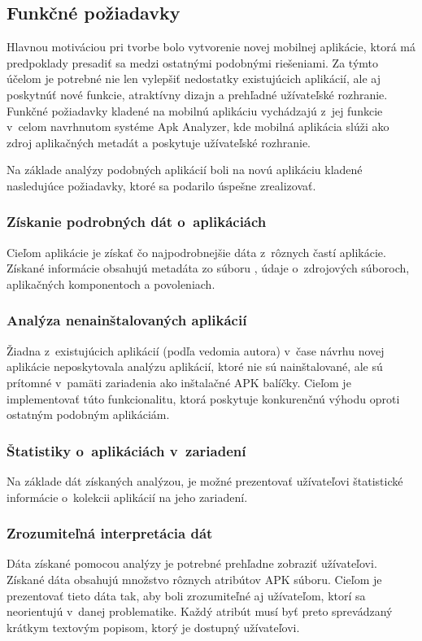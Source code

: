 \subsection{Funkčné požiadavky}
Hlavnou motiváciou pri tvorbe bolo vytvorenie novej mobilnej aplikácie, ktorá má predpoklady presadiť sa medzi ostatnými podobnými riešeniami.  Za týmto účelom je potrebné nie len vylepšiť nedostatky existujúcich aplikácií, ale aj poskytnúť nové funkcie, atraktívny dizajn a prehľadné užívateľské rozhranie.
Funkčné požiadavky kladené na mobilnú aplikáciu vychádzajú z~jej funkcie v~celom navrhnutom systéme Apk Analyzer, kde mobilná aplikácia slúži ako zdroj aplikačných metadát a poskytuje užívateľské rozhranie.


Na základe analýzy podobných aplikácií boli na novú aplikáciu kladené nasledujúce požiadavky, ktoré sa podarilo úspešne zrealizovať.

\subsubsection{\textbf{Získanie podrobných dát o~aplikáciách}}
Cieľom aplikácie je získať čo najpodrobnejšie dáta z~rôznych častí aplikácie. Získané informácie obsahujú metadáta zo súboru , údaje o~zdrojových súboroch, aplikačných komponentoch a povoleniach. 

\subsubsection{\textbf{Analýza nenainštalovaných aplikácií}}
Žiadna z~existujúcich aplikácií (podľa vedomia autora) v~čase návrhu novej aplikácie neposkytovala analýzu aplikácií, ktoré nie sú nainštalované, ale sú prítomné v~pamäti zariadenia ako inštalačné APK balíčky. Cieľom je implementovať túto funkcionalitu, ktorá poskytuje konkurenčnú výhodu oproti ostatným podobným aplikáciám.

\subsubsection{\textbf{Štatistiky o~aplikáciách v~zariadení}}
Na základe dát získaných analýzou, je možné prezentovať užívateľovi štatistické informácie o~kolekcii aplikácií na jeho zariadení.

\subsubsection{\textbf{Zrozumiteľná interpretácia dát}}
Dáta získané pomocou analýzy je potrebné prehľadne zobraziť užívateľovi.  Získané dáta obsahujú množstvo rôznych atribútov APK súboru. Cieľom je prezentovať tieto dáta tak, aby boli zrozumiteľné aj užívateľom, ktorí sa neorientujú v~danej problematike. Každý atribút musí byť preto sprevádzaný krátkym textovým popisom, ktorý je dostupný užívateľovi.


